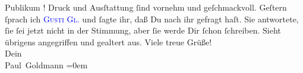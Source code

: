                Publikum \label{K_L02912-3v}\label{K_L02912-3h}!
               Druck und Ausſtattung ſind vornehm und geſchmackvoll.\pend
           \pstart
           {\pb}Geſtern ſprach ich \textcolor{blue}{\textsc{Gusti Gl}.}{}\ledrightnote{\textcolor{blue}{Auguste Chlum}} und ſagte ihr, daß Du nach ihr gefragt
               haſt. Sie antwortete, ſie ſei jetzt nicht in der Stimmung, aber ſie werde Dir ſchon
               ſchreiben. Sieht übrigens angegriffen und gealtert aus.\pend
           \pstart
           Viele treue Grüße! {\\[\baselineskip]}Dein {\\[\baselineskip]}\spacefill\mbox{Paul Goldmann}\pend
           \leftskip=0em{}\endnumbering{}\begin{anhang}\end{anhang}
      
